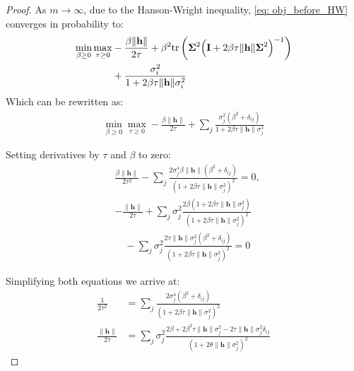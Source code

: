 \documentclass[conference]{IEEEtran}
\begin{document}
\begin{proof}

As $m \to \infty$, due to the Hanson-Wright inequality, \eqref{eq: obj_before_HW} converges in probability to:
\begin{align*}
\min_{\beta \ge 0} \max_{\tau \ge 0} &- \frac{\beta\|\mathbf{h}\|}{2\tau} +\beta^2 \mathrm{tr} \left(\boldsymbol{\Sigma}^2\Bigl(\mathbf{I} + 2 \beta\tau \|\mathbf{h}\|\boldsymbol{\Sigma}^2\Bigr)^{-1}\right) \nonumber\\
&+ \frac{\sigma_i^2}{1 + 2\beta\tau\|\mathbf{h}\|\sigma_i^2} \nonumber
\end{align*}
Which can be rewritten as:
\begin{align}\label{eq: right_after_HW}
\min_{\beta \ge 0} \max_{\tau \ge 0} - \frac{\beta\|\mathbf{h}\|}{2\tau} +  \sum_j \frac{\sigma_j^2(\beta^2 + \delta_{ij})}{1 + 2\beta\tau\|\mathbf{h}\|\sigma_j^2} 
\end{align}


Setting derivatives by $\tau$ and $\beta$ to zero:
\begin{align*}
&\frac{\beta\|\mathbf{h}\|}{2\tau^2} -  \sum_j \frac{2\sigma_j^4\beta\|\mathbf{h}\|(\beta^2 + \delta_{ij})}{(1 + 2\beta\tau\|\mathbf{h}\|\sigma_j^2)^2} = 0, \\
&- \frac{\|\mathbf{h}\|}{2\tau} + \sum_j \sigma_j^2 \frac{2\beta(1 + 2\beta\tau\|\mathbf{h}\|\sigma_j^2)}{(1 + 2\beta\tau\|\mathbf{h}\|\sigma_j^2)^2} \nonumber\\
&\quad - \sum_j \sigma_j^2\frac{2\tau \|\mathbf{h}\|\sigma_j^2(\beta^2 + \delta_{ij})}{(1 + 2\beta\tau\|\mathbf{h}\|\sigma_j^2)^2} = 0 \nonumber
\end{align*}

Simplifying both equations we arrive at:
\begin{align*}
\frac{1}{2\tau^2} &=  \sum_j \frac{2\sigma_j^4(\beta^2 + \delta_{ij})}{(1 + 2\beta\tau\|\mathbf{h}\|\sigma_j^2)^2} \\
\frac{\|\mathbf{h}\|}{2\tau}  &= \sum_j \sigma_j^2 \frac{2\beta + 2\beta^2\tau\|\mathbf{h}\|\sigma_j^2 - 2\tau \|\mathbf{h}\|\sigma_j^2 \delta_{ij}}{(1 + 2\theta\|\mathbf{h}\|\sigma_j^2)^2} \nonumber
\end{align*}


\end{proof}
\end{document}
